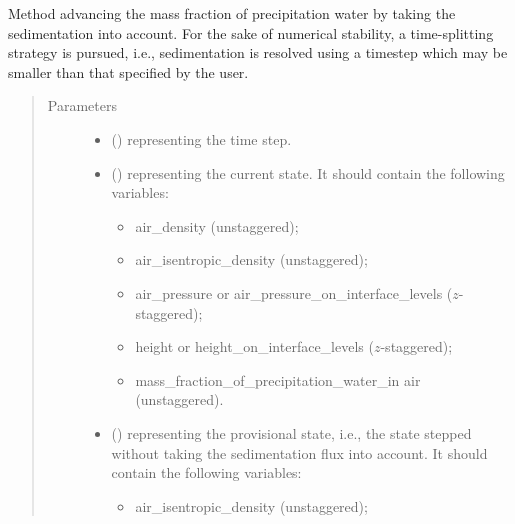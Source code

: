 \documentclass[letterpaper,10pt,english]{sphinxmanual}
\begin{document}
\begin{fulllineitems}
\begin{fulllineitems}
\end{fulllineitems}


\begin{fulllineitems}
\label{\detokenize{api:dycore.prognostic_isentropic_centered.PrognosticIsentropicCentered.step_integrating_sedimentation_flux}}
Method advancing the mass fraction of precipitation water by taking the sedimentation into account.
For the sake of numerical stability, a time-splitting strategy is pursued, i.e., sedimentation is resolved
using a timestep which may be smaller than that specified by the user.
\begin{quote}\begin{description}
\item[{Parameters}] \leavevmode\begin{itemize}
\item {} 
 () \textendash{}  representing the time step.

\item {} 
 () \textendash{} 
 representing the current state.
It should contain the following variables:
\begin{itemize}
\item {} 
air\_density (unstaggered);

\item {} 
air\_isentropic\_density (unstaggered);

\item {} 
air\_pressure or air\_pressure\_on\_interface\_levels (\(z\)-staggered);

\item {} 
height or height\_on\_interface\_levels (\(z\)-staggered);

\item {} 
mass\_fraction\_of\_precipitation\_water\_in air (unstaggered).

\end{itemize}


\item {} 
 () \textendash{} 
 representing the provisional state, i.e.,
the state stepped without taking the sedimentation flux into account.
It should contain the following variables:
\begin{itemize}
\item {} 
air\_isentropic\_density (unstaggered);


\end{itemize}
\end{itemize}
\end{description}
\end{quote}
\end{fulllineitems}
\end{fulllineitems}
\end{document}
